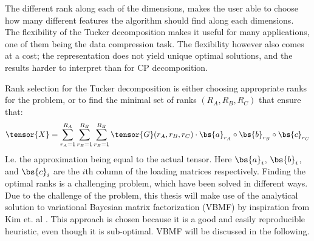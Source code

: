 The different rank along each of the dimensions, makes the user able to choose how many different features the algorithm should find along each dimensions. The flexibility of the Tucker decomposition makes it useful for many applications, one of them being the data compression task. The flexibility however also comes at a cost; the representation does not yield unique optimal solutions, and the results harder to interpret than for CP decomposition.

Rank selection for the Tucker decomposition is either choosing appropriate ranks for the problem, or to find the minimal set of ranks $(R_A, R_B, R_C)$ that ensure that:
\begin{equation}
    \tensor{X} = \sum_{r_A=1}^{R_A} \sum_{r_B=1}^{R_B}
 \sum_{r_B=1}^{R_B} \tensor{G}(r_A, r_B, r_C) \cdot \bs{a}_{r_A} \circ \bs{b}_{r_B} \circ \bs{c}_{r_C}
 \end{equation}
I.e. the approximation being equal to the actual tensor. Here $\bs{a}_i$, $\bs{b}_i$, and $\bs{c}_i$ are the $i$th column of the loading matrices respectively. Finding the optimal ranks is a challenging problem, which have been solved in different ways. Due to the challenge of the problem, this thesis will make use of the analytical solution to variational Bayesian matrix factorization (VBMF) by inspiration from Kim et. al \cite{Kim2016}. This approach is chosen because it is a good and easily reproducible heuristic, even though it is sub-optimal. VBMF will be discussed in the following.

